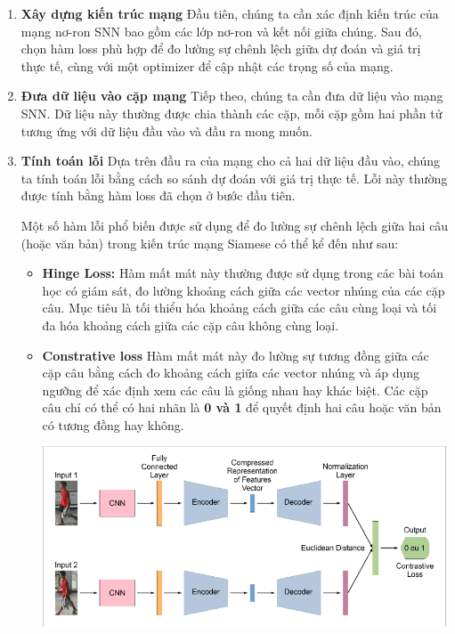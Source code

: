 \documentclass[a4paper, 12pt, openany]{book}
\begin{document}
\begin{enumerate}
    \item \textbf{Xây dựng kiến trúc mạng}  Đầu tiên, chúng ta cần xác định kiến trúc của mạng nơ-ron SNN bao gồm các lớp nơ-ron và kết nối giữa chúng. Sau đó, chọn hàm loss phù hợp để đo lường sự chênh lệch giữa dự đoán và giá trị thực tế, cùng với một optimizer để cập nhật các trọng số của mạng.
    \item \textbf{Đưa dữ liệu vào cặp mạng} Tiếp theo, chúng ta cần đưa dữ liệu vào mạng SNN. Dữ liệu này thường được chia thành các cặp, mỗi cặp gồm hai phần tử tương ứng với dữ liệu đầu vào và đầu ra mong muốn.
    \item \textbf{Tính toán lỗi}  Dựa trên đầu ra của mạng cho cả hai dữ liệu đầu vào, chúng ta tính toán lỗi bằng cách so sánh dự đoán với giá trị thực tế. Lỗi này thường được tính bằng hàm loss đã chọn ở bước đầu tiên.
    
        Một số hàm lỗi phổ biến được sử dụng để đo lường sự chênh lệch giữa hai câu (hoặc văn bản) trong kiến trúc mạng Siamese có thể kể đến như sau:    
        \begin{itemize}
            \item \textbf{Hinge Loss:}  Hàm mất mát này thường được sử dụng trong các bài toán học có giám sát, đo lường khoảng cách giữa các vector nhúng của các cặp câu. Mục tiêu là tối thiểu hóa khoảng cách giữa các câu cùng loại và tối đa hóa khoảng cách giữa các cặp câu không cùng loại.
            \item \textbf{Constrative loss} Hàm mất mát này đo lường sự tương đồng giữa các cặp câu bằng cách đo khoảng cách giữa các vector nhúng và áp dụng ngưỡng để xác định xem các câu là giống nhau hay khác biệt.
            Các cặp câu chỉ có thể có hai nhãn là \textbf{0 và 1} để quyết định hai câu hoặc văn bản có tương đồng hay không.

            \begin{minipage}{\linewidth}
                \captionsetup{type=figure}
                \centering
                \includegraphics[width=12cm]{./assets/images/siamese-cnn.png}
            \end{minipage}


\end{itemize}
\end{enumerate}
\end{document}
